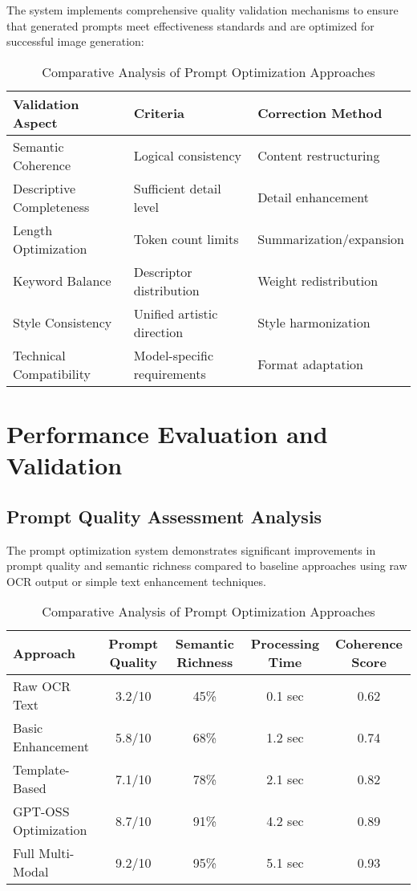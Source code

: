 \begin{table}[H]
\begin{table}[H]
The system implements comprehensive quality validation mechanisms to ensure that generated prompts meet effectiveness standards and are optimized for successful image generation:

\begin{table}[H]
\centering
\caption{Prompt Quality Validation Framework}
\label{tab:prompt_validation}
{\begin{tabular}{lll}
\toprule
\textbf{Validation Aspect} & \textbf{Criteria} & \textbf{Correction Method} \\
\midrule
Semantic Coherence & Logical consistency & Content restructuring \\
Descriptive Completeness & Sufficient detail level & Detail enhancement \\
Length Optimization & Token count limits & Summarization/expansion \\
Keyword Balance & Descriptor distribution & Weight redistribution \\
Style Consistency & Unified artistic direction & Style harmonization \\
Technical Compatibility & Model-specific requirements & Format adaptation \\
\bottomrule
\end{tabular}}
\end{table}

\section{Performance Evaluation and Validation}

\subsection{Prompt Quality Assessment Analysis}

The prompt optimization system demonstrates significant improvements in prompt quality and semantic richness compared to baseline approaches using raw OCR output or simple text enhancement techniques.

\begin{table}[H]
\centering
\caption{Comparative Analysis of Prompt Optimization Approaches}
\label{tab:optimization_comparison}
{\begin{tabular}{lcccc}
\toprule
\textbf{Approach} & \textbf{Prompt Quality} & \textbf{Semantic Richness} & \textbf{Processing Time} & \textbf{Coherence Score} \\
\midrule
Raw OCR Text & 3.2/10 & 45\% & 0.1 sec & 0.62 \\
Basic Enhancement & 5.8/10 & 68\% & 1.2 sec & 0.74 \\
Template-Based & 7.1/10 & 78\% & 2.1 sec & 0.82 \\
GPT-OSS Optimization & 8.7/10 & 91\% & 4.2 sec & 0.89 \\
Full Multi-Modal & 9.2/10 & 95\% & 5.1 sec & 0.93 \\
\bottomrule
\end{tabular}}
\end{table}


\end{table}
\end{table}
